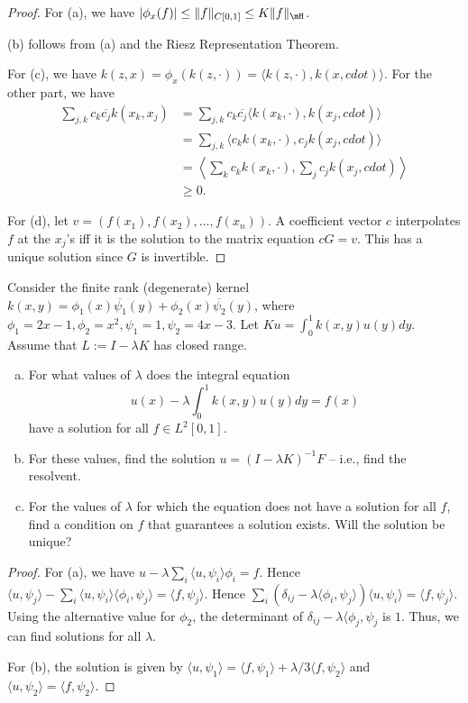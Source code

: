 \documentclass{article}
\begin{document}
\begin{proof}
For (a), we have $|\phi_x(f)| \le \|f\|_{C[0,1]} \le K \|f\|_{\mH}$.

(b) follows from (a) and the Riesz Representation Theorem.

For (c), we have $k(z,x) = \phi_x(k(z, \cdot)) = \langle k(z, \cdot) , k(x, cdot) \rangle$.  For the other part, we have  
\begin{align*}
\sum_{j,k} c_k \overline{c_j} k(x_k, x_j) & =  \sum_{j,k} c_k \overline{c_j} \langle k(x_k, \cdot) , k(x_j, cdot) \rangle
\\ & =  \sum_{j,k} \langle c_k k(x_k, \cdot) , c_j k(x_j, cdot) \rangle
\\ & =  \left\langle \sum_k c_k k(x_k, \cdot) , \sum_j c_j k(x_j, cdot) \right \rangle
\\ & \ge 0.
\end{align*}

For (d), let $v = (f(x_1), f(x_2), \ldots, f(x_n))$.  A coefficient vector $c$ interpolates $f$ at the $x_j$'s iff it is the solution to the matrix equation $c G = v$. This has a unique solution since $G$ is invertible.
\end{proof}

 Consider the finite rank (degenerate) kernel $k(x,y) = \phi_1(x) \overline{\psi_1}(y) + \phi_2(x) \overline{\psi_2} (y)$, where $\phi_1 = 2x - 1, \phi_2 = x^2, \psi_1 = 1, \psi_2 = 4x - 3$. Let $Ku = \int_0^1 k(x,y) u(y) dy$. Assume that $L:= I - \lambda K$ has closed range.

\begin{enumerate}[a.]
\item For what values of $\lambda$ does the integral equation
$$u(x) - \lambda \int_0^1 k(x,y) u(y) dy = f(x)$$
have a solution for all $f \in L^2[0,1]$.
\item For these values, find the solution $u = (I - \lambda K)^{-1} F$ -- i.e., find the resolvent.
\item For the values of $\lambda$ for which the equation does not have a solution for all $f$, find a condition on $f$ that guarantees a solution exists. Will the solution be unique?
\end{enumerate}

\begin{proof}
For (a), we have $u - \lambda \sum_i \langle u, \psi_i \rangle \phi_i = f$.  Hence $\langle u, \psi_j \rangle - \sum_i \langle u, \psi_i \rangle \langle \phi_i, \psi_j \rangle = \langle f, \psi_j \rangle$.
Hence $ \sum_i (\delta_{ij}  - \lambda \langle \phi_i, \psi_j \rangle) \langle u, \psi_i \rangle = \langle f, \psi_j \rangle$.
Using the alternative value for $\phi_2$, the determinant of $\delta_{ij} - \lambda \langle \phi_j, \psi_j$ is $1$.  Thus, we can find solutions for all $\lambda$.

For (b), the solution is given by $\langle u, \psi_1 \rangle = \langle f, \psi_1 \rangle + \lambda/3 \langle f, \psi_2 \rangle$ and $\langle u, \psi_2  \rangle = \langle f, \psi_2 \rangle$.

\end{proof}
\end{document}

